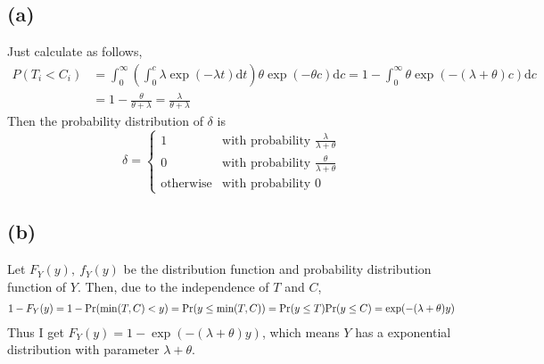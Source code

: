 \documentclass{article}
\begin{document}
\subsection{(a)}
Just calculate as follows,
\begin{align*}
	P(T_i < C_i) &= \int_0^{\infty} \left( \int_0^c \lambda \exp\left( -\lambda t \right) \mathrm{d}t\right) \theta \exp \left( -\theta c \right) \mathrm{d}c = 1 - \int_0^{\infty} \theta \exp \left( -(\lambda+\theta)c \right) \mathrm{d}c \\
	&= 1 - \frac{\theta}{\theta + \lambda} = \frac{\lambda}{ \theta + \lambda}
\end{align*}
Then the probability distribution of $\delta$ is
\begin{equation}
	\delta = 
	\begin{cases}
		1 & \text{with probability $\frac{\lambda}{\lambda + \theta}$} \\
		0 & \text{with probability $\frac{\theta}{\lambda + \theta}$} \\
		\text{otherwise} & \text{with probability $0$}
	\end{cases} \nonumber
\end{equation}

\subsection{(b)}
Let $F_Y(y),\ f_Y(y)$ be the distribution function and probability distribution function of $Y$. Then, due to the independence of $T$ and $C$,
\begin{align*}
	1 - F_Y(y) = 1- {\rm Pr} (\min(T, C) < y) = {\rm Pr}(y \leq \min(T,C)) = {\rm Pr}(y \leq T) {\rm Pr}(y \leq C) = \exp(-(\lambda + \theta)y)
\end{align*}
Thus I get $F_Y(y) = 1 - \exp(-(\lambda + \theta)y)$, which means $Y$ has a exponential distribution with parameter $\lambda + \theta$.
\end{document}
